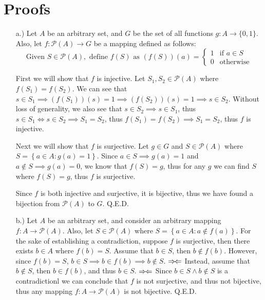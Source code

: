 \documentclass[11pt]{article}
\newcommand{\contradiction}{
    \ensuremath{{\Rightarrow\mspace{-2mu}\Leftarrow}}
}
\newcommand{\braces}[1]{\left\{#1\right\}}
\begin{document}
\section*{Proofs}
\begin{itemize}
    \item [a.)] Let $A$ be an arbitrary set, and $G$ be the set of all functions $g:A\to\{0,1\}$. Also, let $f:\mathcal{P}(A)\to G$ be a mapping defined as follows:
    \[\text{Given }S\in\mathcal{P}(A),\text{ define }f(S)\text{ as }(f(S))(a)=\begin{cases}
        1 & \text{if }a\in S \\
        0 & \text{otherwise}
    \end{cases}\]

    First we will show that $f$ is injective. Let $S_1,S_2\in\mathcal{P}(A)$ where $f(S_1)=f(S_2)$. We can see that $s\in S_1\implies (f(S_1))(s)=1\implies(f(S_2))(s)=1\implies s\in S_2$. Without loss of generality, we also see that $s\in S_2\implies s\in S_1$, thus $s\in S_1\iff s\in S_2\implies S_1=S_2$, thus $f(S_1)=f(S_2)\implies S_1=S_2$, thus $f$ is injective.

    Next we will show that $f$ is surjective. Let $g\in G$ and $S\in\mathcal{P}(A)$ where $S=\braces{a\in A:g(a)=1}$. Since $a\in S\implies g(a)=1$ and $a\notin S\implies g(a)=0$, we know that $f(S)=g$, thus for any $g$ we can find $S$ where $f(S)=g$, thus $f$ is surjective.

    Since $f$ is both injective and surjective, it is bijective, thus we have found a bijection from $\mathcal{P}(A)$ to $G$. Q.E.D.

    \pagebreak
    \item [b.)] Let $A$ be an arbitrary set, and consider an arbitrary mapping $f:A\to\mathcal{P}(A)$. Also, let $S\in\mathcal{P}(A)$ where $S=\braces{a\in A:a\notin f(a)}$. For the sake of establishing a contradiction, suppose $f$ is surjective, then there exists $b\in A$ where $f(b)=S$. Assume that $b\in S$, then $b\notin f(b)$. However, since $f(b)=S$, $b\in S\implies b\in f(b)\implies b\notin S$.\contradiction Instead, assume that $b\notin S$, then $b\in f(b)$, and thus $b\in S$.\contradiction Since $b\in S\land b\notin S$ is a contradictionl we can conclude that $f$ is not surjective, and thus not bijective, thus any mapping $f:A\to\mathcal{P}(A)$ is not bijective. Q.E.D.
\end{itemize}
\end{document}

